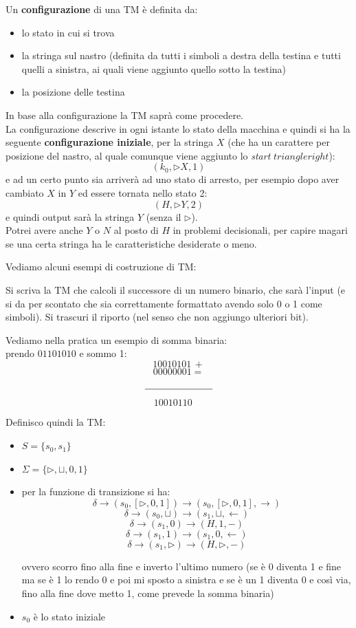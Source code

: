 \documentclass[a4paper,12pt, oneside]{book}
\begin{document}
\begin{definizione}
  Un \textbf{configurazione} di una TM è definita da:
  \begin{itemize}
    \item lo stato in cui si trova
    \item la stringa sul nastro (definita da tutti i simboli a destra della
    testina e tutti quelli a sinistra, ai quali viene aggiunto quello sotto la
    testina)
    \item la posizione delle testina 
  \end{itemize}
  In base alla configurazione la TM saprà come procedere.\\
  La configurazione descrive in ogni istante lo stato della macchina e quindi si
  ha la seguente \textbf{configurazione iniziale}, per la stringa $X$ (che ha un
  carattere per posizione del nastro, al quale comunque viene aggiunto lo
  \textit{start} $triangleright$):
  \[(k_0,\triangleright X, 1)\]
  e ad un certo punto sia arriverà ad uno stato di arresto, per esempio dopo
  aver cambiato $X$ in $Y$ ed essere tornata nello stato 2:
  \[(H,\triangleright Y, 2)\]
  e quindi output sarà la stringa $Y$ (senza il $\triangleright$).\\
  Potrei avere anche $Y$ o $N$ al posto di $H$ in problemi decisionali, per
  capire magari se una certa stringa ha le caratteristiche desiderate o meno.
\end{definizione}
Vediamo alcuni esempi di costruzione di TM:
\begin{esempio}
  Si scriva la TM che calcoli il successore di un numero binario, che sarà
  l'input (e si da per scontato che sia correttamente formattato avendo solo 0 o
  1 come simboli). Si trascuri il riporto (nel senso che non aggiungo ulteriori
  bit).\\
  \begin{shaded}
    Vediamo nella pratica un esempio di somma binaria:\\
    prendo $01101010$ e sommo 1:
    \[10010101 \, +\]
    \[00000001=\]
    \[\rule{70pt}{.4pt}\]
    \[10010110\,\,\,\,\,\,\,\]
  \end{shaded}
  Definisco quindi la TM:
  \begin{itemize}
    \item $S=\{s_0,s_1\}$
    \item $\Sigma =\{\triangleright, \sqcup, 0,1\}$
    \item per la funzione di transizione si ha:
    \[\delta\to(s_0,[\triangleright, 0,1])\to(s_0,[\triangleright, 0,1],
      \rightarrow)\]
    \[\delta\to(s_0,\sqcup)\to(s_1,\sqcup,\leftarrow)\]
    \[\delta\to(s_1,0)\to(H,1,-)\]
    \[\delta\to(s_1,1)\to(s_1,0,\leftarrow)\]
    \[\delta\to(s_1,\triangleright)\to(H,\triangleright,-)\]

    ovvero scorro fino alla fine e inverto l'ultimo numero 
    (se è 0 diventa 1 e fine ma se è 1 lo rendo 0 e poi mi sposto a sinistra e
    se è un 1 diventa 0 e così via, fino alla
    fine dove metto 1, come prevede la somma binaria)
    \item $s_0$ è lo stato iniziale
  \end{itemize}
\end{esempio}
\end{document}
